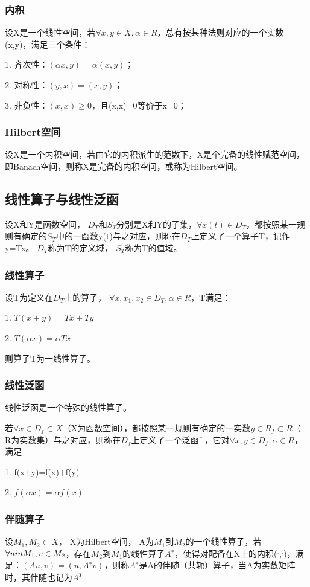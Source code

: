 \documentclass{article}
\begin{document}
\subsubsection{内积}
设X是一个线性空间，若$\forall x,y\in X, \alpha\in R$，总有按某种法则对应的一个实数(x,y)，满足三个条件：

1. 齐次性：$(\alpha x,y)=\alpha(x,y)$；

2. 对称性：$(y,x)=(x,y)$；

3. 非负性：$(x,x)\ge0$，且(x,x)=0等价于x=0；

\subsubsection{Hilbert空间}
设X是一个内积空间，若由它的内积派生的范数下，X是个完备的线性赋范空间，即Banach空间，则称X是完备的内积空间，或称为Hilbert空间。

\subsection{线性算子与线性泛函}
设X和Y是函数空间， $D_T$和$S_T$分别是X和Y的子集，$\forall x(t)\in D_T$，都按照某一规则有确定的$S_T$中的一函数y(t)与之对应，则称在$D_T$上定义了一个算子T，记作y=Tx。 $D_T$称为T的定义域， $S_T$称为T的值域。

\subsubsection{线性算子}
设T为定义在$D_T$上的算子， $\forall x,x_1,x_2\in D_T,\alpha\in R$，T满足：

1. $T(x+y)=Tx+Ty$

2. $T(\alpha x) = \alpha Tx$

则算子T为一线性算子。

\subsubsection{线性泛函}
线性泛函是一个特殊的线性算子。

若$\forall x\in D_f\subset X$（X为函数空间），都按照某一规则有确定的一实数$y\in R_f\subset R$（ R为实数集）与之对应，则称在$D_f$上定义了一个泛函f ，它对$\forall x,y\in D_f,\alpha\in R$，满足

1. f(x+y)=f(x)+f(y)

2. $f(\alpha x)=\alpha f(x)$

\subsubsection{伴随算子}
设$M_1,M_2\subset X$， X为Hilbert空间， A为$M_1$到$M_2$的一个线性算子，若$\forall u\\in M_1,v\in M_2$，存在$M_2$到$M_1$的线性算子$A^∗$，使得对配备在X上的内积(∙,∙)，满足：$(Au,v)=(u,A^∗v)$，则称$A^∗$是A的伴随（共轭）算子，当A为实数矩阵时，其伴随也记为$A^T$
\end{document}
